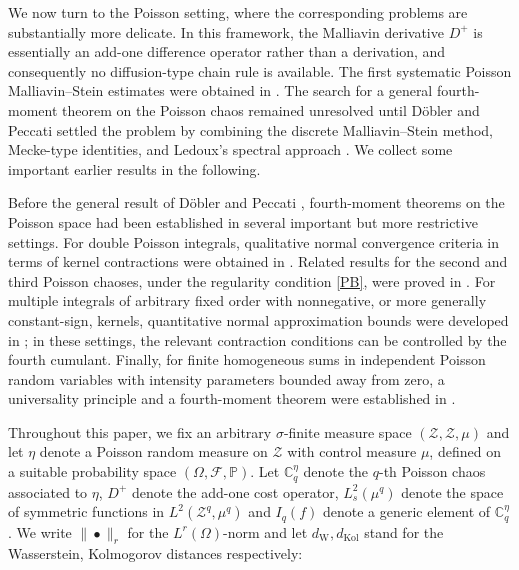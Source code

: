 \documentclass[ECP,preprint]{ejpecp}
\newcommand{\PP}{\mathbb{P}}
\newcommand{\cZ}{\mathcal{Z}}
\newcommand{\cF}{\mathcal{F}}
\newcommand{\sZ}{\mathscr{Z}}
\newcommand{\bC}{\mathbb{C}^\eta}
\newcommand{\dK}{d_{\mathrm{Kol}}}
\newcommand{\dW}{d_{\mathrm W}}
\newcommand{\s}{\sigma}
\newcommand{\bul}{\bullet}
\begin{document}
We now turn to the Poisson setting, 
where the corresponding problems are substantially more delicate. 
In this framework, the Malliavin derivative $D^+$ is essentially 
an add-one difference operator rather than a derivation, 
and consequently no diffusion-type chain rule is available.
The first systematic Poisson Malliavin--Stein
estimates were obtained in \cite{PSTU10,PZ10}.
The search for a general fourth-moment theorem on
the Poisson chaos remained unresolved until
D\"obler and Peccati \cite{DP18} settled the
problem by combining the discrete
Malliavin--Stein method, Mecke-type identities, and
Ledoux's spectral approach \cite{Led12}.
We collect  some important
earlier results in the following. 


 
\begin{remark}\label{rem_prior_FMT}
Before the general result of D\"obler and Peccati
\cite{DP18}, fourth-moment theorems on the Poisson
space had been established in several important but
more restrictive settings.  For double Poisson
integrals, qualitative normal convergence criteria
in terms of kernel contractions were obtained in
\cite{PT08}.  Related results for the second and
third Poisson chaoses, under the regularity condition
\eqref{PB}, were proved in \cite{BP16}.  For multiple
integrals of arbitrary fixed order with nonnegative,
or more generally constant-sign, kernels,
quantitative normal approximation bounds were
developed in \cite{LRP13,ET14,Sch16}; in these
settings, the relevant contraction conditions can be
controlled by the fourth cumulant.  Finally, for
finite homogeneous sums in independent Poisson
random variables with intensity parameters bounded
away from zero, a universality principle and a
fourth-moment theorem were established in
\cite{PZ14}.
\end{remark}


 

Throughout this paper, we fix an arbitrary $\s$-finite measure space 
$(\cZ, \sZ, \mu)$ and let $\eta$ denote a Poisson random measure 
on $\cZ$ with control measure $\mu$, defined on a suitable probability space 
$(\Omega, \cF, \PP)$. 
Let $\bC_q$ denote the $q$-th Poisson chaos associated to $\eta$,
$D^+$ denote the add-one cost operator,  $L^2_s(\mu^q)$
denote the space of symmetric functions in $L^2(\cZ^q, \mu^q)$
and 
$I_q(f)$  denote a generic element of $\bC_q$.
We write $\| \bul\|_r$ for the $L^r(\Omega)$-norm
and let $\dW, \dK$ stand for the Wasserstein, Kolmogorov distances
respectively:
\end{document}
